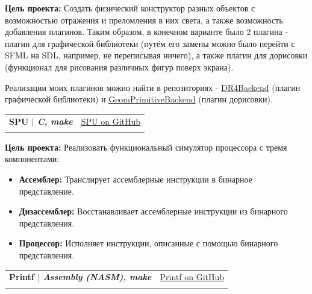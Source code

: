 \documentclass[A4,11pt]{article}
\makeatletter
\newcommand{\CVSubheading}[4]{
  \vspace{-2pt}\item
    \begin{tabular*}{0.97\textwidth}[t]{l@{\extracolsep{\fill}}r}
      \textbf{#1} & #2 \\
      \small#3 & \small #4 \\
    \end{tabular*}\vspace{-7pt}
}
\makeatother
\begin{document}
      \small{
      \textbf{Цель проекта:} Создать физический конструктор разных объектов с возможностью отражения и преломления в них света, а также возможность добавления плагинов. Таким образом, в конечном варианте было 2 плагина - плагин для графической библиотеки (путём его замены можно было перейти с SFML на SDL, например, не переписывая ничего), а также плагин для дорисовки (функционал для рисования различных фигур поверх экрана).

Реализации моих плагинов можно найти в репозиториях - \href{https://github.com/Dinichthys/DR4Backend}{DR4Backend} (плагин графической библиотеки) и \href{https://github.com/Dinichthys/GeomPrimitiveBackend}{GeomPrimitiveBackend} (плагин дорисовки).
}
    \CVSubheading
      {{SPU} $|$ \emph{\small{C, make}}}{\href{https://github.com/Dinichthys/SPU}{SPU on GitHub}}{}{}
      \small{
      \textbf{Цель проекта:}
       Реализовать функциональный симулятор процессора с тремя компонентами:
\begin{itemize}[nosep]
  \item \textbf{Ассемблер:} Транслирует ассемблерные инструкции в бинарное представление.
  \item \textbf{Дизассемблер:} Восстанавливает ассемблерные инструкции из бинарного представления.
  \item \textbf{Процессор:} Исполняет инструкции, описанные с помощью бинарного представления.
\end{itemize}
}
    \CVSubheading
      {{Printf} $|$ \emph{\small{Assembly (NASM), make}}}{\href{https://github.com/Dinichthys/Printf}{Printf on GitHub}}{}{}
\end{document}
